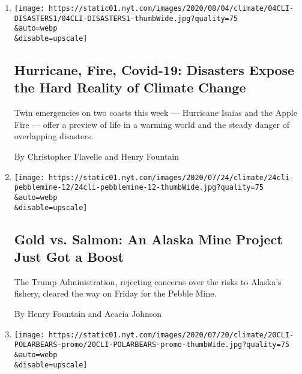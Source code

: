 \begin{enumerate}
\def\labelenumi{\arabic{enumi}.}
\item
  \href{/2020/08/04/climate/hurricane-isaias-apple-fire-climate.html}{}

  \texttt{[image: https://static01.nyt.com/images/2020/08/04/climate/04CLI-DISASTERS1/04CLI-DISASTERS1-thumbWide.jpg?quality=75\\\&auto=webp\\\&disable=upscale]}

  \hypertarget{hurricane-fire-covid-19-disasters-expose-the-hard-reality-of-climate-change}{%
  \subsection{Hurricane, Fire, Covid-19: Disasters Expose the Hard
  Reality of Climate
  Change}\label{hurricane-fire-covid-19-disasters-expose-the-hard-reality-of-climate-change}}

  Twin emergencies on two coasts this week --- Hurricane Isaias and the
  Apple Fire --- offer a preview of life in a warming world and the
  steady danger of overlapping disasters.

  By Christopher Flavelle and Henry Fountain
\item
  \href{/2020/07/24/climate/pebble-mine-alaska-environment.html}{}

  \texttt{[image: https://static01.nyt.com/images/2020/07/24/climate/24cli-pebblemine-12/24cli-pebblemine-12-thumbWide.jpg?quality=75\\\&auto=webp\\\&disable=upscale]}

  \hypertarget{gold-vs-salmon-an-alaska-mine-project-just-got-a-boost}{%
  \subsection{Gold vs. Salmon: An Alaska Mine Project Just Got a
  Boost}\label{gold-vs-salmon-an-alaska-mine-project-just-got-a-boost}}

  The Trump Administration, rejecting concerns over the risks to
  Alaska's fishery, cleared the way on Friday for the Pebble Mine.

  By Henry Fountain and Acacia Johnson
\item
  \href{/2020/07/20/climate/polar-bear-extinction.html}{}

  \texttt{[image: https://static01.nyt.com/images/2020/07/20/climate/20CLI-POLARBEARS-promo/20CLI-POLARBEARS-promo-thumbWide.jpg?quality=75\\\&auto=webp\\\&disable=upscale]}

  \hypertarget{global-warming-is-driving-polar-bears-toward-extinction-researchers-say}{%
}
\end{enumerate}
